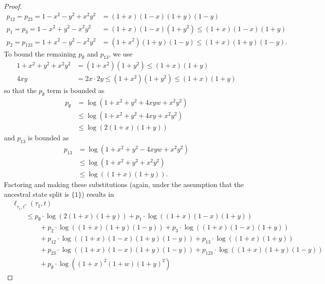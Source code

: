 \begin{proof}
\begin{align*}
p_{12} = p_{23} = 1-x^2-y^2+x^2y^2 & = (1+x)(1-x)(1+y)(1-y) \\
p_{1} = p_{3} = 1-x^2+y^2-x^2y^2 & = (1+x)(1-x)(1+y^2) \le (1+x)(1-x)(1+y) \\
p_{2} = p_{123} = 1+x^2-y^2-x^2y^2 & = (1+x^2)(1+y)(1-y) \le (1+x)(1+y)(1-y).
\end{align*}
To bound the remaining $p_{\emptyset}$ and $p_{13}$, we use
\begin{align*}
1+x^2+y^2+x^2y^2 & = (1+x^2)(1+y^2) \le (1+x)(1+y) \\
4xy & = 2x \cdot 2y \le (1+x^2)(1+y^2) \le (1+x)(1+y)
\end{align*}
so that the $p_{\emptyset}$ term is bounded as
\begin{align*}
    p_{\emptyset} & = \log(1+x^2+y^2+4xyw+x^2y^2) \\
                  & \le \log(1+x^2+y^2+4xy+x^2y^2) \\
                  & \le \log(2(1+x)(1+y))
\end{align*}
and $p_{13}$ is bounded as
\begin{align*}
    p_{13} & = \log(1+x^2+y^2-4xyw+x^2y^2) \\
                  & \le \log(1+x^2+y^2+x^2y^2) \\
                  & \le \log((1+x)(1+y)).
\end{align*}
Factoring and making these substitutions (again, under the assumption that the ancestral state split is $\{1\}$) results in
\begin{align*}
&    \ell_{\tau_1,t^*}(\tau_1, t) \\
&\qquad \le      p_{\emptyset}  \cdot\log(2(1+x)(1+y))
+ p_{1}          \cdot\log((1+x)(1-x)(1+y)) \\
    &\qquad\qquad + p_{2}          \cdot\log((1+x)(1+y)(1-y))
+ p_{3}          \cdot\log((1+x)(1-x)(1+y)) \\
    &\qquad\qquad + p_{12}         \cdot\log((1+x)(1-x)(1+y)(1-y))
+ p_{13}         \cdot\log((1+x)(1+y)) \\
    &\qquad\qquad + p_{23}         \cdot\log((1+x)(1-x)(1+y)(1-y))
+ p_{123}        \cdot\log((1+x)(1+y)(1-y)) \\
    &\qquad\qquad + p_{\emptyset}  \cdot\log((1+x)^2   (1+w)(1+y)^2)

\end{align*}
\end{proof}
